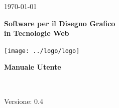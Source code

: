 \usepackage{multirow}
\title{\TITOLODOC}
\author{Marco Cunico}
 

 
\renewcommand{\insertversion}{0.4} %
\renewcommand{\TITOLODOC}{Manuale Utente} %
\renewcommand{\glosspath}{.\glossario} %
 
\begin{titlepage}
\begin{center}
  \begin{Large}  \today \end{Large}
\end{center}
 
\vspace{20pt}
 
\begin{center}
  \begin{Huge}
        \textbf{\ajax}
  \end{Huge}
\end{center}      
 
\begin{center}
  \begin{large}
        \textbf{Software per il Disegno Grafico\\ in Tecnologie Web}
  \end{large}
\end{center}      
 
\vspace{20pt}
 
\begin{center}
\texttt{[image: ../logo/logo]}
\end{center}
 
\vspace{170pt}
\begin{center} %
  \begin{Huge}
        \textbf{\TITOLODOC}
  \end{Huge}
      \\
\end{center}
\vspace{190pt}
\begin{center}
Versione: \insertversion
\end{center}
\end{titlepage}
 
